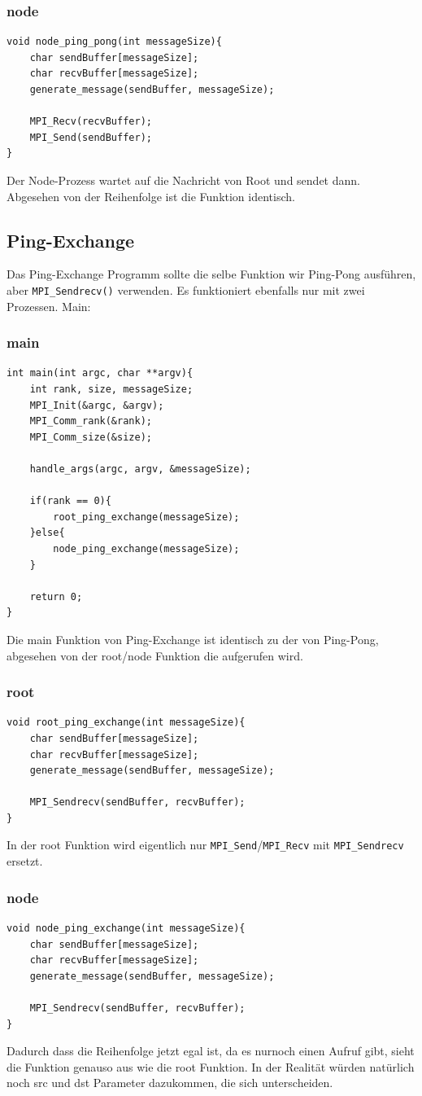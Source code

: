 \documentclass{report}
\begin{document}
\subsubsection*{node}
\begin{lstlisting}
void node_ping_pong(int messageSize){
    char sendBuffer[messageSize];
    char recvBuffer[messageSize];
    generate_message(sendBuffer, messageSize);

    MPI_Recv(recvBuffer);
    MPI_Send(sendBuffer);
}
\end{lstlisting}
Der Node-Prozess wartet auf die Nachricht von Root und sendet dann. Abgesehen 
von der Reihenfolge ist die Funktion identisch.
\newpage
\subsection*{Ping-Exchange}
Das Ping-Exchange Programm sollte die selbe Funktion
wir Ping-Pong ausführen, aber \verb|MPI_Sendrecv()| verwenden.
Es funktioniert ebenfalls nur mit zwei Prozessen. Main:
\subsubsection*{main}
\begin{lstlisting}
int main(int argc, char **argv){
    int rank, size, messageSize;
    MPI_Init(&argc, &argv);
    MPI_Comm_rank(&rank);
    MPI_Comm_size(&size);

    handle_args(argc, argv, &messageSize);

    if(rank == 0){
        root_ping_exchange(messageSize);
    }else{
        node_ping_exchange(messageSize);
    }

    return 0;
}
\end{lstlisting}
Die main Funktion von Ping-Exchange ist identisch zu der von Ping-Pong, 
abgesehen von der root/node Funktion die aufgerufen wird.
\subsubsection*{root}
\begin{lstlisting}
void root_ping_exchange(int messageSize){
    char sendBuffer[messageSize];
    char recvBuffer[messageSize];
    generate_message(sendBuffer, messageSize);

    MPI_Sendrecv(sendBuffer, recvBuffer);
}
\end{lstlisting}
In der root Funktion wird eigentlich nur \verb|MPI_Send|/\verb|MPI_Recv| mit 
\verb|MPI_Sendrecv| ersetzt.
\subsubsection*{node}
\begin{lstlisting}
void node_ping_exchange(int messageSize){
    char sendBuffer[messageSize];
    char recvBuffer[messageSize];
    generate_message(sendBuffer, messageSize);

    MPI_Sendrecv(sendBuffer, recvBuffer);
}
\end{lstlisting}
Dadurch dass die Reihenfolge jetzt egal ist, da es nurnoch einen Aufruf gibt, 
sieht die Funktion genauso aus wie die root Funktion. In
der Realität würden natürlich noch src und dst Parameter dazukommen, die sich 
unterscheiden.
\newpage
\end{document}
